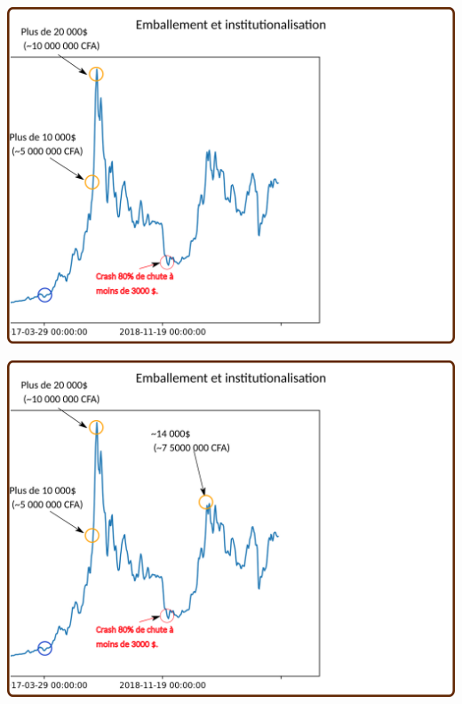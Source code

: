\documentclass[presentation]{beamer}
\begin{document}
\begin{frame}[label={sec:orgd084714}]{}
\begin{center}
\includegraphics[width=.95\textwidth]{./Pictures/Timeline/42emballement_crash3.png}
\end{center}
\end{frame}

\begin{frame}[label={sec:org0f440e5}]{}
\begin{center}
\includegraphics[width=.95\textwidth]{./Pictures/Timeline/43emballement_rebond.png}
\end{center}
\end{frame}
\end{document}
